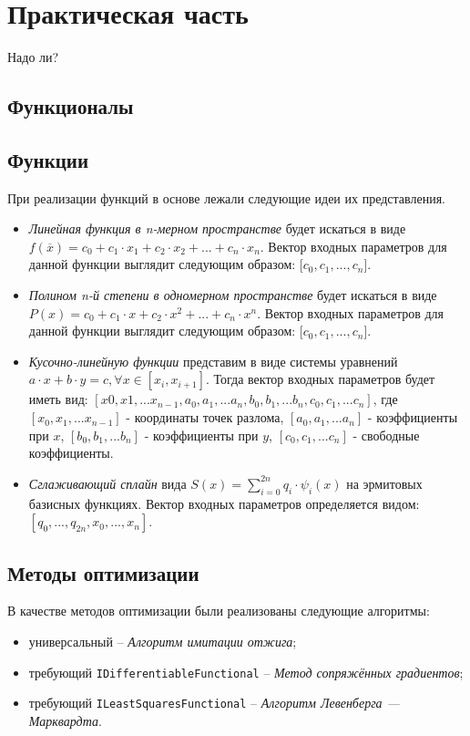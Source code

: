 \chapter{Практическая часть}

Надо ли?

\section{Функционалы}

\section{Функции}

При реализации функций в основе лежали следующие идеи их представления.

\begin{itemize}
		\item \textsl{Линейная функция в n-мерном пространстве} будет искаться в виде $f(\overline{x}) = c_0 + c_1 \cdot x_1 + c_2 \cdot x_2 + ... + c_n \cdot x_n$. Вектор входных параметров для данной функции выглядит следующим образом: [$c_0, c_1, ..., c_n$].
		\item \textsl{Полином n-й степени в одномерном пространстве} будет искаться в виде $P(x) = c_0 + c_1 \cdot x + c_2 \cdot x^2 + ... + c_n \cdot x^n$. Вектор входных параметров для данной функции выглядит следующим образом: [$c_0, c_1, ..., c_n$].
		\item \textsl{Кусочно-линейную функции} представим в виде системы уравнений $a \cdot x + b \cdot y = c, \forall x \in [x_i, x_{i + 1}]$. Тогда вектор входных параметров будет иметь вид: $[x0, x1, ... x_{n - 1}, a_0, a_1, ... a_n, b_0, b_1, ... b_n, c_0, c_1, ... c_n]$, где $[x_0, x_1, ... x_{n-1}]$ - координаты точек разлома, $[a_0, a_1, ... a_n]$ - коэффициенты при $x$, $[b_0, b_1, ... b_n]$ - коэффициенты при $y$, $[c_0, c_1, ... c_n]$ - свободные коэффициенты.
		\item \textsl{Сглаживающий сплайн} вида $S(x) = \sum_{i = 0}^{2n} q_i \cdot \psi_i(x)$ на эрмитовых базисных функциях. Вектор входных параметров определяется видом: $[q_0, ..., q_{2n}, x_0, ..., x_n]$.
	\end{itemize}
\section{Методы оптимизации}

В качестве методов оптимизации были реализованы следующие алгоритмы:

\begin{itemize}
	\item универсальный -- \textsl{Алгоритм имитации отжига};
	\item требующий \texttt{IDifferentiableFunctional} -- \textsl{Метод сопряжённых градиентов};
	\item требующий \texttt{ILeastSquaresFunctional} -- \textsl{Алгоритм Левенберга — Марквардта}.
\end{itemize}
